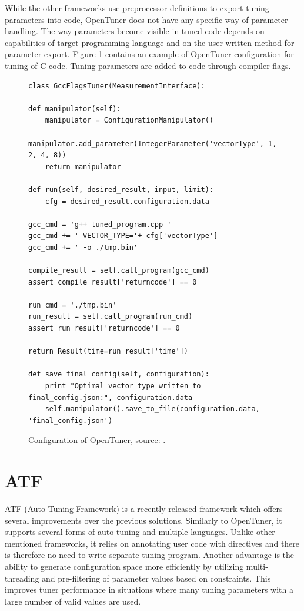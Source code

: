 \documentclass
[
    digital, %
    oneside, %
    table, %
    nolof, %
    nolot, %
    nocover %
]{fithesis3}
\begin{document}
While the other frameworks use preprocessor definitions to export tuning parameters into code, OpenTuner does not have any specific way of parameter
handling. The way parameters become visible in tuned code depends on capabilities of target programming language and on the user-written method for
parameter export. Figure \ref{opentuner-example} contains an example of OpenTuner configuration for tuning of C code. Tuning parameters are added
to code through compiler flags.

\begin{figure}[ht]
\begin{adjustwidth}{-1cm}{-1cm}
\begin{lstlisting}
class GccFlagsTuner(MeasurementInterface):

def manipulator(self):
    manipulator = ConfigurationManipulator()
    manipulator.add_parameter(IntegerParameter('vectorType', 1, 2, 4, 8))
    return manipulator

def run(self, desired_result, input, limit):
    cfg = desired_result.configuration.data

gcc_cmd = 'g++ tuned_program.cpp '
gcc_cmd += '-VECTOR_TYPE='+ cfg['vectorType']
gcc_cmd += ' -o ./tmp.bin'

compile_result = self.call_program(gcc_cmd)
assert compile_result['returncode'] == 0

run_cmd = './tmp.bin'
run_result = self.call_program(run_cmd)
assert run_result['returncode'] == 0

return Result(time=run_result['time'])

def save_final_config(self, configuration):
    print "Optimal vector type written to final_config.json:", configuration.data
    self.manipulator().save_to_file(configuration.data, 'final_config.json')
\end{lstlisting}
\caption{Configuration of OpenTuner, source: \cite{opentuner}.}
\label{opentuner-example}
\end{adjustwidth}
\end{figure}

\section{ATF}
ATF (Auto-Tuning Framework) \cite{atf} is a recently released framework which offers several improvements over the previous solutions. Similarly to
OpenTuner, it supports several forms of auto-tuning and multiple languages. Unlike other mentioned frameworks, it relies on annotating user code
with directives and there is therefore no need to write separate tuning program. Another advantage is the ability to generate configuration space
more efficiently by utilizing multi-threading and pre-filtering of parameter values based on constraints. This improves tuner performance in
situations where many tuning parameters with a large number of valid values are used.
\end{document}
